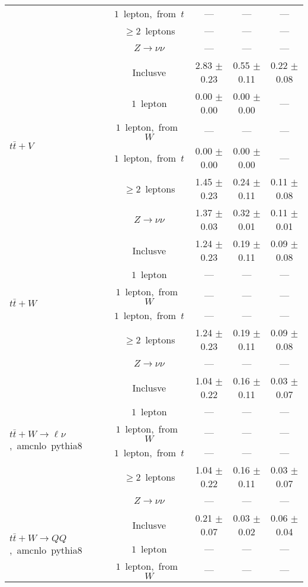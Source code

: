 \documentclass{article}
\begin{document}
\begin{longtable}{|l|c|c|c|c|}
 & $1$~lepton,~from~$t$  & ---  & ---  & --- \\* 
 & $\ge2$~leptons  & ---  & ---  & --- \\* 
 & $Z\rightarrow\nu\nu$  & ---  & ---  & --- \\* 
\hline 
\multirow{6}{*}{$t\bar{t}+V$} & Inclusve  & 2.83 $\pm$ 0.23  & 0.55 $\pm$ 0.11  & 0.22 $\pm$ 0.08 \\* 
 & $1$~lepton  & 0.00 $\pm$ 0.00  & 0.00 $\pm$ 0.00  & --- \\* 
 & $1$~lepton,~from~$W$  & ---  & ---  & --- \\* 
 & $1$~lepton,~from~$t$  & 0.00 $\pm$ 0.00  & 0.00 $\pm$ 0.00  & --- \\* 
 & $\ge2$~leptons  & 1.45 $\pm$ 0.23  & 0.24 $\pm$ 0.11  & 0.11 $\pm$ 0.08 \\* 
 & $Z\rightarrow\nu\nu$  & 1.37 $\pm$ 0.03  & 0.32 $\pm$ 0.01  & 0.11 $\pm$ 0.01 \\* 
\hline 
\multirow{6}{*}{$t\bar{t}+W$} & Inclusve  & 1.24 $\pm$ 0.23  & 0.19 $\pm$ 0.11  & 0.09 $\pm$ 0.08 \\* 
 & $1$~lepton  & ---  & ---  & --- \\* 
 & $1$~lepton,~from~$W$  & ---  & ---  & --- \\* 
 & $1$~lepton,~from~$t$  & ---  & ---  & --- \\* 
 & $\ge2$~leptons  & 1.24 $\pm$ 0.23  & 0.19 $\pm$ 0.11  & 0.09 $\pm$ 0.08 \\* 
 & $Z\rightarrow\nu\nu$  & ---  & ---  & --- \\* 
\hline 
\multirow{6}{*}{$t\bar{t}+W{\rightarrow}{\ell}{\nu}$,~amcnlo~pythia8} & Inclusve  & 1.04 $\pm$ 0.22  & 0.16 $\pm$ 0.11  & 0.03 $\pm$ 0.07 \\* 
 & $1$~lepton  & ---  & ---  & --- \\* 
 & $1$~lepton,~from~$W$  & ---  & ---  & --- \\* 
 & $1$~lepton,~from~$t$  & ---  & ---  & --- \\* 
 & $\ge2$~leptons  & 1.04 $\pm$ 0.22  & 0.16 $\pm$ 0.11  & 0.03 $\pm$ 0.07 \\* 
 & $Z\rightarrow\nu\nu$  & ---  & ---  & --- \\* 
\hline 
\multirow{6}{*}{$t\bar{t}+W{\rightarrow}QQ$,~amcnlo~pythia8} & Inclusve  & 0.21 $\pm$ 0.07  & 0.03 $\pm$ 0.02  & 0.06 $\pm$ 0.04 \\* 
 & $1$~lepton  & ---  & ---  & --- \\* 
 & $1$~lepton,~from~$W$  & ---  & ---  & --- \\* 

\end{longtable}
\end{document}
